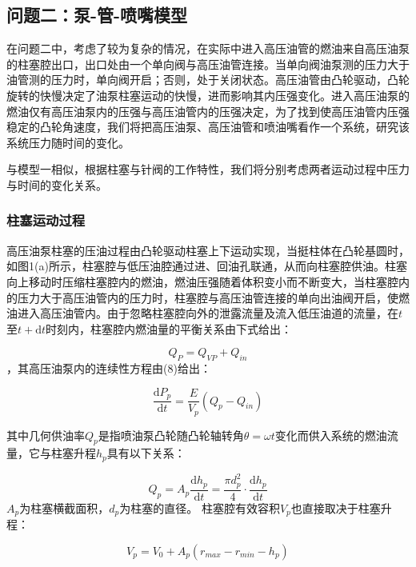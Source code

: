 \documentclass[withoutpreface,bwprint]{cumcmthesis} %
\begin{document}
			\subsection{问题二：泵-管-喷嘴模型}
			在问题二中，考虑了较为复杂的情况，在实际中进入高压油管的燃油来自高压油泵的柱塞腔出口，出口处由一个单向阀与高压油管连接。当单向阀油泵测的压力大于油管测的压力时，单向阀开启；否则，处于关闭状态。高压油管由凸轮驱动，凸轮旋转的快慢决定了油泵柱塞运动的快慢，进而影响其内压强变化。进入高压油泵的燃油仅有高压油泵内的压强与高压油管内的压强决定，为了找到使高压油管内压强稳定的凸轮角速度，我们将把高压油泵、高压油管和喷油嘴看作一个系统，研究该系统压力随时间的变化。
			
			与模型一相似，根据柱塞与针阀的工作特性，我们将分别考虑两者运动过程中压力与时间的变化关系。
			\subsubsection{柱塞运动过程}
			
			高压油泵柱塞的压油过程由凸轮驱动柱塞上下运动实现，当挺柱体在凸轮基圆时，如图1(a)所示，柱塞腔与低压油腔通过进、回油孔联通，从而向柱塞腔供油。柱塞向上移动时压缩柱塞腔内的燃油，燃油压强随着体积变小而不断变大，当柱塞腔内的压力大于高压油管内的压力时，柱塞腔与高压油管连接的单向出油阀开启，使燃油进入高压油管内。由于忽略柱塞腔向外的泄露流量及流入低压油道的流量，在$t$至$t + \mathrm{d}t$时刻内，柱塞腔内燃油量的平衡关系由下式给出：
			
			\begin{equation}Q_P = Q_{VP} + Q_{in}\end{equation}，其高压油泵内的连续性方程由(8)给出：
			
			\begin{equation}\frac{\mathrm{d}P_p}{\mathrm{d}t} = \frac{E}{V_p}(Q_{p} - Q_{in})\end{equation}
			
			其中几何供油率$Q_p$是指喷油泵凸轮随凸轮轴转角$\theta = \omega t$变化而供入系统的燃油流量，它与柱塞升程$h_p$具有以下关系：
			
			\begin{equation}Q_p = A_p \frac{\mathrm{d}h_p}{\mathrm{d}t} = \frac{\pi d_p^2}{4} \cdot \frac{\mathrm{d}h_p}{\mathrm{d}t}\end{equation}
			$A_p$为柱塞横截面积，$d_p$为柱塞的直径。
			柱塞腔有效容积$V_p$也直接取决于柱塞升程：
			
			\begin{equation}V_p = V_0 + A_p (r_{max} - r_{min} - h_p)\end{equation}
			
\end{document}
